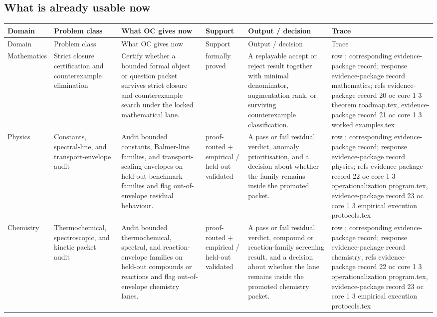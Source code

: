 \subsection{What is already usable now}
\begingroup
\scriptsize
\setlength{\emergencystretch}{1.5em}
\setlength{\tabcolsep}{2pt}
\setlength{\LTleft}{0pt}
\setlength{\LTright}{0pt}
\begin{longtable}{@{}L{0.11\textwidth}L{0.16\textwidth}L{0.19\textwidth}L{0.12\textwidth}L{0.18\textwidth}L{0.16\textwidth}@{}}
\toprule
Domain & Problem class & What OC gives now & Support & Output / decision & Trace \\
\midrule
\endfirsthead
\toprule
Domain & Problem class & What OC gives now & Support & Output / decision & Trace \\
\midrule
\endhead
Mathematics & Strict closure certification and counterexample elimination & Certify whether a bounded formal object or question packet survives strict closure and counterexample search under the locked mathematical lane. & formally proved & A replayable accept or reject result together with minimal denominator, augmentation rank, or surviving counterexample classification. & row ; corresponding evidence-package record; \allowbreak response evidence-package record mathematics; \allowbreak refs evidence-package record 20 oc core 1 3 theorem roadmap.tex, \allowbreak evidence-package record 21 oc core 1 3 worked examples.tex \\
Physics & Constants, spectral-line, and transport-envelope audit & Audit bounded constants, Balmer-line families, and transport-scaling envelopes on held-out benchmark families and flag out-of-envelope residual behaviour. & proof-routed + empirical / held-out validated & A pass or fail residual verdict, anomaly prioritisation, and a decision about whether the family remains inside the promoted packet. & row ; corresponding evidence-package record; \allowbreak response evidence-package record physics; \allowbreak refs evidence-package record 22 oc core 1 3 operationalization program.tex, \allowbreak evidence-package record 23 oc core 1 3 empirical execution protocols.tex \\
Chemistry & Thermochemical, spectroscopic, and kinetic packet audit & Audit bounded thermochemical, spectral, and reaction-envelope families on held-out compounds or reactions and flag out-of-envelope chemistry lanes. & proof-routed + empirical / held-out validated & A pass or fail residual verdict, compound or reaction-family screening result, and a decision about whether the lane remains inside the promoted chemistry packet. & row ; corresponding evidence-package record; \allowbreak response evidence-package record chemistry; \allowbreak refs evidence-package record 22 oc core 1 3 operationalization program.tex, \allowbreak evidence-package record 23 oc core 1 3 empirical execution protocols.tex \\

\end{longtable}
